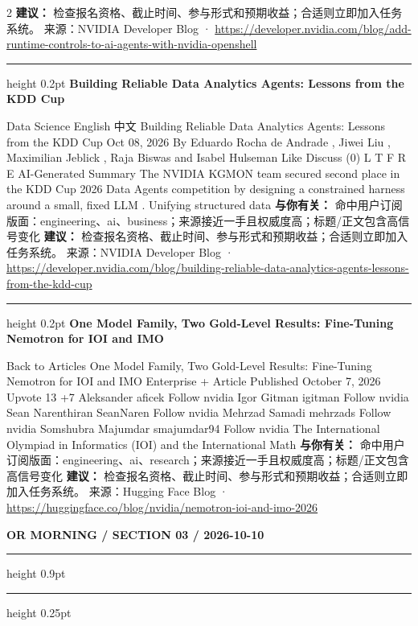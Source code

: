\documentclass[10.5pt]{ctexart}
\begin{document}
\begin{multicols}{2}
\textbf{建议：} 检查报名资格、截止时间、参与形式和预期收益；合适则立即加入任务系统。
{\footnotesize\color{ormuted} 来源：NVIDIA Developer Blog · \url{https://developer.nvidia.com/blog/add-runtime-controls-to-ai-agents-with-nvidia-openshell}}
\vspace{2mm}
\hrule height 0.2pt
\vspace{2mm}
{\large\bfseries Building Reliable Data Analytics Agents: Lessons from the KDD Cup}\par
Data Science English 中文 Building Reliable Data Analytics Agents: Lessons from the KDD Cup Oct 08, 2026 By Eduardo Rocha de Andrade , Jiwei Liu , Maximilian Jeblick , Raja Biswas and Isabel Hulseman Like Discuss (0) L T F R E AI-Generated Summary The NVIDIA KGMON team secured second place in the KDD Cup 2026 Data Agents competition by designing a constrained harness around a small, fixed LLM . Unifying structured data
\textbf{与你有关：} 命中用户订阅版面：engineering、ai、business；来源接近一手且权威度高；标题/正文包含高信号变化
\textbf{建议：} 检查报名资格、截止时间、参与形式和预期收益；合适则立即加入任务系统。
{\footnotesize\color{ormuted} 来源：NVIDIA Developer Blog · \url{https://developer.nvidia.com/blog/building-reliable-data-analytics-agents-lessons-from-the-kdd-cup}}
\vspace{2mm}
\hrule height 0.2pt
\vspace{2mm}
{\large\bfseries One Model Family, Two Gold-Level Results: Fine-Tuning Nemotron for IOI and IMO}\par
Back to Articles One Model Family, Two Gold-Level Results: Fine-Tuning Nemotron for IOI and IMO Enterprise + Article Published October 7, 2026 Upvote 13 +7 Aleksander aficek Follow nvidia Igor Gitman igitman Follow nvidia Sean Narenthiran SeanNaren Follow nvidia Mehrzad Samadi mehrzads Follow nvidia Somshubra Majumdar smajumdar94 Follow nvidia The International Olympiad in Informatics (IOI) and the International Math
\textbf{与你有关：} 命中用户订阅版面：engineering、ai、research；来源接近一手且权威度高；标题/正文包含高信号变化
\textbf{建议：} 检查报名资格、截止时间、参与形式和预期收益；合适则立即加入任务系统。
{\footnotesize\color{ormuted} 来源：Hugging Face Blog · \url{https://huggingface.co/blog/nvidia/nemotron-ioi-and-imo-2026}}
\end{multicols}
\newpage
{\small\bfseries OR MORNING / SECTION 03 / 2026-10-10}
\vspace{2mm}
\hrule height 0.9pt
\vspace{1.5mm}
\hrule height 0.25pt
\vspace{4mm}
\end{document}

